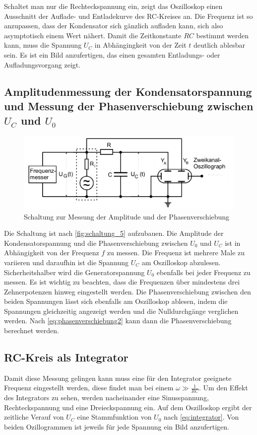 Schaltet man nur die Rechteckspannung ein, zeigt das Oszilloskop einen Ausschnitt der Auflade- und Entladekurve des RC-Kreises an. Die Frequenz ist so anzupassen, dass der Kondensator sich gänzlich aufladen kann, sich also asymptotisch einem Wert nähert. Damit die Zeitkonstante $RC$ bestimmt werden kann, muss die Spannung $U_C$ in Abhängingkeit von der Zeit $t$ deutlich ablesbar sein. Es ist ein Bild anzufertigen, das einen gesamten Entladungs- oder Aufladungsvorgang zeigt. 

\subsection{Amplitudenmessung der Kondensatorspannung und Messung der Phasenverschiebung zwischen $U_C$ und $U_0$}
\label{sec:Durchführung_2}

\begin{figure}
    \centering
    \includegraphics[width=\textwidth/2]{images/schaltung_5.png}
    \caption{Schaltung zur Messung der Amplitude und der Phasenverschiebung  \cite{V353}}
    \label{fig:schaltung_5}
\end{figure}

Die Schaltung ist nach \autoref{fig:schaltung_5} aufzubauen. Die Amplitude der Kondensatorspannung und die Phasenverschiebung zwischen $U_0$ und $U_C$ ist in Abhängigkeit von der Frequenz $f$ zu messen. Die Frequenz ist mehrere Male zu variieren und daraufhin ist die Spannung $U_C$ am Oszilloskop abzulesen. Sicherheitshalber wird die Generatorspannung $U_0$ ebenfalls bei jeder Frequenz zu messen. Es ist wichtig zu beachten, dass die Frequenzen über mindestens drei Zehnerpotenzen hinweg eingestellt werden. 
Die Phasenverschiebung zwischen den beiden Spannungen lässt sich ebenfalls am Oszilloskop ablesen, indem die Spannungen gleichzeitig angezeigt werden und die Nulldurchgänge verglichen werden.
Nach \autoref{eq:phasenverschiebung2} kann dann die Phasenverschiebung berechnet werden. 

\subsection{RC-Kreis als Integrator}
\label{sec:Durchführung_3}

Damit diese Messung gelingen kann muss eine für den Integrator geeignete Frequenz eingestellt werden, diese findet man bei einem $\omega \gg \frac{1}{RC}$. Um den Effekt des Integrators zu sehen, werden nacheinander eine Sinusspannung, Rechteckspannung und eine Dreieckspannung ein. Auf dem Oszilloskop ergibt der zeitliche Verauf von $U_C$ eine Stammfunktion von $U_0$ nach \autoref{eq:integrator}. Von beiden Ozillogrammen ist jeweils für jede Spannung ein Bild anzufertigen.

